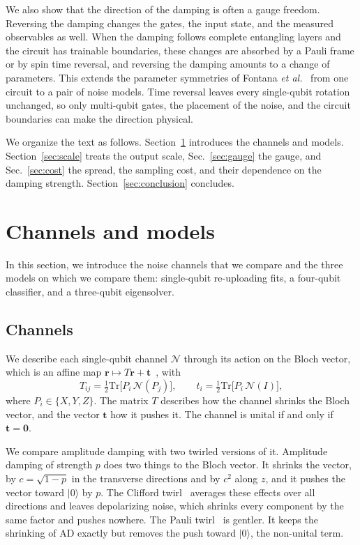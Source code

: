 \documentclass[
 aps,pra,
 twocolumn,
 superscriptaddress,
 longbibliography,
 nofootinbib
]{revtex4-2}
\newcommand{\Tr}{\mathrm{Tr}}
\providecommand{\ket}[1]{\lvert #1 \rangle}
\begin{document}
We also show that the direction of the damping is often a gauge freedom.
Reversing the damping changes the gates, the input state, and the measured
observables as well. When the damping follows complete entangling layers and
the circuit has trainable boundaries, these changes are absorbed by a Pauli
frame or by spin time reversal, and reversing the damping
amounts to a change of parameters. This extends the parameter symmetries of Fontana
\textit{et al.}~\cite{fontana2022nontrivial} from one circuit to a pair of
noise models. Time reversal leaves every single-qubit rotation unchanged, so
only multi-qubit gates, the placement of the noise, and the circuit boundaries
can make the direction physical.

We organize the text as follows. Section~\ref{sec:setting} introduces the
channels and models. Section~\ref{sec:scale} treats the output scale,
Sec.~\ref{sec:gauge} the gauge, and Sec.~\ref{sec:cost} the spread, the
sampling cost, and their dependence on the damping strength.
Section~\ref{sec:conclusion} concludes.

\section{Channels and models}
\label{sec:setting}

In this section, we introduce the noise channels that we compare and the three
models on which we compare them: single-qubit re-uploading fits, a four-qubit
classifier, and a three-qubit eigensolver.

\subsection{Channels}
\label{sec:channels}

We describe each single-qubit channel $\mathcal N$ through its action on the
Bloch vector, which is an affine map $\mathbf r\mapsto T\mathbf r+\mathbf t$~\cite{nielsen2010quantum}, with
\begin{equation}
T_{ij}=\tfrac12\Tr\bigl[P_i\,\mathcal N(P_j)\bigr],\qquad
t_i=\tfrac12\Tr\bigl[P_i\,\mathcal N(I)\bigr],
\label{eq:bloch}
\end{equation}
where $P_i\in\{X,Y,Z\}$. The matrix $T$ describes how the channel shrinks the
Bloch vector, and the vector $\mathbf t$ how it pushes it. The channel is
unital if and only if $\mathbf t=\mathbf 0$.

We compare amplitude damping with two twirled versions of it. Amplitude damping
of strength $p$ does two things to the Bloch vector. It shrinks the vector, by
$c=\sqrt{1-p}$ in the transverse directions and by $c^2$ along $z$, and it
pushes the vector toward $\ket0$ by $p$. The Clifford twirl~\cite{dankert2009exact}
averages these effects over all directions and leaves depolarizing noise, which
shrinks every component by the same factor and pushes nowhere. The Pauli
twirl~\cite{dur2005standard,wallman2016noise} is gentler. It keeps the
shrinking of AD exactly but removes the push toward $\ket0$, the non-unital
term.
\end{document}
